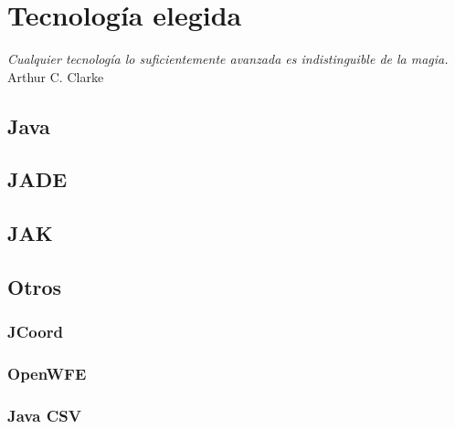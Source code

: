 
\chapter*{Tecnología elegida} \label{cap4}


\begin{flushright}
\begin{minipage}{7.85cm}
    {\em Cualquier tecnología lo suficientemente avanzada es indistinguible de
    la magia.} \\ Arthur C. Clarke
\end{minipage}
\end{flushright}

\vspace*{5mm}

\section*{Java}

\section*{JADE}

\section*{JAK}

\section*{Otros}


\subsection*{JCoord}

\subsection*{OpenWFE}

\subsection*{Java CSV}